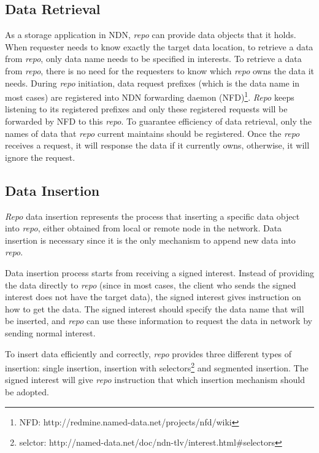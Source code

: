 \documentclass[conference]{IEEEtran}
\begin{document}
\subsection{Data Retrieval}

As a storage application in NDN, \emph{repo} can provide data objects that it holds. When requester needs to know exactly the target data location, to retrieve a data from \emph{repo}, only data name needs to be specified in interests.  To retrieve a data from \emph{repo}, there is no need for the requesters to know which \emph{repo} owns the data it needs. During \emph{repo} initiation, data request prefixes (which is the data name in most cases) are registered into NDN forwarding daemon (NFD)\footnote{NFD: http://redmine.named-data.net/projects/nfd/wiki}. \emph{Repo} keeps listening to its registered prefixes and only these registered requests will be forwarded by NFD to this \emph{repo}. To guarantee efficiency of data retrieval, only the names of data that \emph{repo} current maintains should be registered. Once the \emph{repo} receives a request, it will response the data if it currently owns, otherwise, it will ignore the request.

\subsection{Data Insertion}

\emph{Repo} data insertion represents the process that inserting a specific data object into \emph{repo}, either obtained from local or remote node in the network. Data insertion is necessary since it is the only mechanism to append new data into \emph{repo}.

Data insertion process starts from receiving a signed interest. Instead of providing the data directly to \emph{repo} (since in most cases, the client who sends the signed interest does not have the target data), the signed interest gives instruction on how to get the data. The signed interest should specify the data name that will be inserted, and \emph{repo} can use these information to request the data in network by sending normal interest.

To insert data efficiently and correctly, \emph{repo} provides three different types of insertion: single insertion, insertion with selectors\footnote{selctor: http://named-data.net/doc/ndn-tlv/interest.html\#selectors} and segmented insertion. The signed interest will give \emph{repo} instruction that which insertion mechanism should be adopted.
\end{document}
